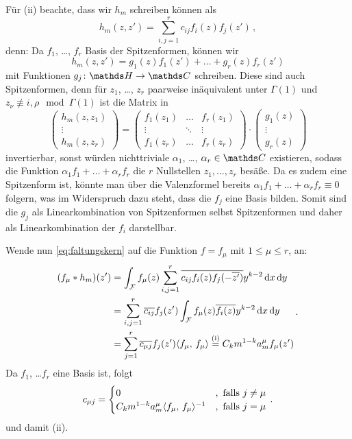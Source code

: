 \begin{bewe}
	Für (ii) beachte, dass wir $h_m$ schreiben können als
	\[
	h_m(z,z') = \sum_{i,j=1}^r c_{ij}f_i(z)f_j(z')
	\,,
	\]
	denn: Da $f_1$, \ldots, $f_r$ Basis der Spitzenformen, können wir 
	\[
	h_m(z, z') = g_1(z) f_1(z') + \ldots + g_r(z) f_r(z')
	\]
	mit Funktionen $g_j \colon \HH \ra \CC$ schreiben. 
	Diese sind auch Spitzenformen, denn für $z_1$, \ldots, $z_r$ paarweise inäquivalent unter $\Gamma(1)$ und $z_\nu \not\equiv i, \rho \mod \Gamma(1)$ ist die Matrix in
	\[
	\begin{pmatrix}
	h_m(z,z_1) \\
	\vdots \\
	h_m(z,z_r)
	\end{pmatrix}
	= \begin{pmatrix}
	f_1(z_1) & \ldots & f_r(z_1) \\
	\vdots & \ddots & \vdots \\
	f_1(z_r) & \ldots & f_r(z_r)
	\end{pmatrix}
	\cdot 
	\begin{pmatrix}
	g_1(z) \\
	\vdots \\
	g_r(z)
	\end{pmatrix}
	\]
	invertierbar, sonst würden nichttriviale $\alpha_1$, \ldots, $\alpha_r \in \CC$ existieren, sodass die Funktion $\alpha_1 f_1 + \ldots + \alpha_r f_r$ die $r$ Nullstellen $z_1, \ldots, z_r$ besäße. Da es zudem eine Spitzenform ist, könnte man über die Valenzformel bereits $\alpha_1 f_1 + \ldots + \alpha_r f_r \equiv 0$ folgern, was im Widerspruch dazu steht, dass die $f_j$ eine Basis bilden.
	Somit sind die $g_j$ als Linearkombination von Spitzenformen selbst Spitzenformen und daher als Linearkombination der $f_i$ darstellbar.
	
	Wende nun \eqref{eq:faltungskern} auf die Funktion $f = f_\mu$ mit $1 \leq \mu \leq r$, an:
	\[
	\begin{split}
	(f_\mu * h_m)(z')
	&= \int_\F f_\mu(z) \sum_{i,j=1}^r \conj{c_{ij} f_i(z) f_j(-\conj{z'})} y^{k-2} \opd x \opd y \\
	&= \sum_{i,j=1}^r \conj{c_{ij}} f_j(z') \int_\F f_\mu(z) \conj{f_i(z)} y^{k-2} \opd x \opd y \\
	&= \sum_{j=1}^r \conj{c_{\mu j}} f_j(z') \scalarprd{f_\mu}{f_\mu}
	\stackrel{\text{(i)}}{=} C_km^{1-k} a_m^\mu f_\mu(z')
	\end{split}
	\,.
	\]
	Da $f_1$, \ldots $f_r$ eine Basis ist, folgt
	\[
	c_{\mu j} =
	\begin{cases}
	0 & , \text{ falls } j \not= \mu \\
	C_k m^{1-k} a_m^\mu \scalarprd{f_\mu}{f_\mu}^{-1} & , \text{ falls } j = \mu
	\end{cases}
	\,.
	\]
	und damit (ii).
	

\end{bewe}
